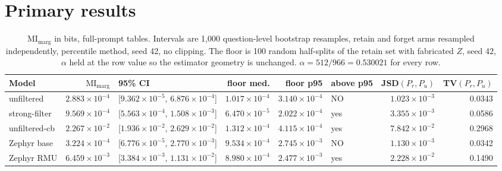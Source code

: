 \documentclass[11pt]{article}
\begin{document}
\section{Primary results}
\begin{table}[h]\centering\scriptsize
\begin{tabular}{lrlrrlrr}
\toprule
Model & $\mathrm{MI}_{\mathrm{marg}}$ & 95\% CI & floor med. & floor p95 & above p95 & JSD$(P_r,P_u)$ & TV$(P_r,P_u)$\\
\midrule
unfiltered & $2.883\times10^{-4}$ & [$9.362\times10^{-5}$, $6.876\times10^{-4}$] & $1.017\times10^{-4}$ & $3.140\times10^{-4}$ & NO & $1.023\times10^{-3}$ & 0.0343\\
strong-filter & $9.569\times10^{-4}$ & [$5.563\times10^{-4}$, $1.508\times10^{-3}$] & $6.470\times10^{-5}$ & $2.022\times10^{-4}$ & yes & $3.355\times10^{-3}$ & 0.0586\\
unfiltered-cb & $2.267\times10^{-2}$ & [$1.936\times10^{-2}$, $2.629\times10^{-2}$] & $1.312\times10^{-4}$ & $4.115\times10^{-4}$ & yes & $7.842\times10^{-2}$ & 0.2968\\
Zephyr base & $3.224\times10^{-4}$ & [$6.776\times10^{-5}$, $2.770\times10^{-3}$] & $9.534\times10^{-4}$ & $2.745\times10^{-3}$ & NO & $1.130\times10^{-3}$ & 0.0342\\
Zephyr RMU & $6.459\times10^{-3}$ & [$3.384\times10^{-3}$, $1.131\times10^{-2}$] & $8.980\times10^{-4}$ & $2.477\times10^{-3}$ & yes & $2.228\times10^{-2}$ & 0.1490\\
\bottomrule\end{tabular}
\caption{$\mathrm{MI}_{\mathrm{marg}}$ in bits, full-prompt tables. Intervals are
1{,}000 question-level bootstrap resamples, retain and forget arms resampled independently,
percentile method, seed 42, no clipping. The floor is 100 random half-splits of the retain
set with fabricated $Z$, seed 42, $\alpha$ held at the row value so the estimator geometry
is unchanged. $\alpha=512/966=0.530021$ for every row.}\label{tab:primary}
\end{table}
\end{document}
